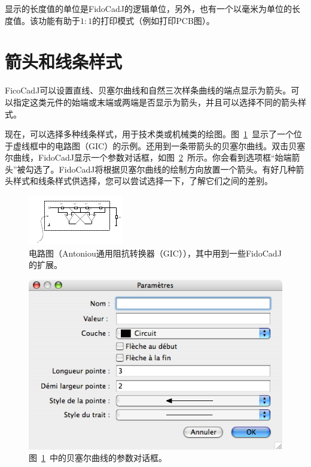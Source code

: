 \documentclass[10pt,a4paper,twoside]{scrreprt}
\begin{document}
显示的长度值的单位是FidoCadJ的逻辑单位，另外，也有一个以毫米为单位的长度值。该功能有助于$1:1$的打印模式（例如打印PCB图）。

\section{箭头和线条样式}

FicoCadJ可以设置直线、贝塞尔曲线和自然三次样条曲线的端点显示为箭头。可以指定这类元件的始端或末端或两端是否显示为箭头，并且可以选择不同的箭头样式。

现在，可以选择多种线条样式，用于技术类或机械类的绘图。图~\ref{fig_gyrator}~显示了一个位于虚线框中的电路图（GIC）的示例。还用到一条带箭头的贝塞尔曲线。双击贝塞尔曲线，FidoCadJ显示一个参数对话框，如图~\ref{fig_parametri_bezier}~所示。你会看到选项框“始端箭头”被勾选了。FidoCadJ将根据贝塞尔曲线的绘制方向放置一个箭头。有好几种箭头样式和线条样式供选择，您可以尝试选择一下，了解它们之间的差别。

\begin{figure}
\includegraphics[width=\textwidth]{gyrator}
\caption{电路图（Antoniou通用阻抗转换器（GIC）），其中用到一些FidoCadJ的扩展。}
\label{fig_gyrator}
\end{figure}

\begin{figure}
\centering
\includegraphics[width=.7\textwidth]{parametri_bezier}
\caption{图~\ref{fig_gyrator}~中的贝塞尔曲线的参数对话框。}
\label{fig_parametri_bezier}
\end{figure}
\end{document}

